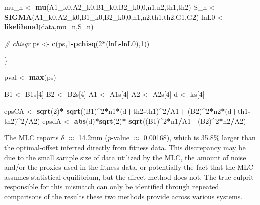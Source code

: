 \documentclass[]{article}
\newenvironment{Shaded}{\begin{snugshade}}{\end{snugshade}}
\newcommand{\CommentTok}[1]{\textcolor[rgb]{0.56,0.35,0.01}{\textit{#1}}}
\newcommand{\DecValTok}[1]{\textcolor[rgb]{0.00,0.00,0.81}{#1}}
\newcommand{\KeywordTok}[1]{\textcolor[rgb]{0.13,0.29,0.53}{\textbf{#1}}}
\newcommand{\NormalTok}[1]{#1}
\newcommand{\OperatorTok}[1]{\textcolor[rgb]{0.81,0.36,0.00}{\textbf{#1}}}
\newcommand{\StringTok}[1]{\textcolor[rgb]{0.31,0.60,0.02}{#1}}
\begin{document}
\begin{Shaded}
\begin{Highlighting}[]
\NormalTok{  mu_n <-}\StringTok{ }\KeywordTok{mu}\NormalTok{(A1_k0,A2_k0,B1_k0,B2_k0,}\DecValTok{0}\NormalTok{,n1,n2,th1,th2)}
\NormalTok{  S_n <-}\StringTok{ }\KeywordTok{SIGMA}\NormalTok{(A1_k0,A2_k0,B1_k0,B2_k0,}\DecValTok{0}\NormalTok{,n1,n2,th1,th2,G1,G2)}
\NormalTok{  lnL0  <-}\StringTok{ }\KeywordTok{likelihood}\NormalTok{(data,mu_n,S_n)}
  
  \CommentTok{# chisqr}
\NormalTok{  ps <-}\StringTok{ }\KeywordTok{c}\NormalTok{(ps,}\DecValTok{1}\OperatorTok{-}\KeywordTok{pchisq}\NormalTok{(}\DecValTok{2}\OperatorTok{*}\NormalTok{(lnL}\OperatorTok{-}\NormalTok{lnL0),}\DecValTok{1}\NormalTok{))}
  
\NormalTok{\}}

\NormalTok{pval <-}\StringTok{ }\KeywordTok{max}\NormalTok{(ps)}

\NormalTok{B1 <-}\StringTok{ }\NormalTok{B1s[}\DecValTok{4}\NormalTok{]}
\NormalTok{B2 <-}\StringTok{ }\NormalTok{B2s[}\DecValTok{4}\NormalTok{]}
\NormalTok{A1 <-}\StringTok{ }\NormalTok{A1s[}\DecValTok{4}\NormalTok{]}
\NormalTok{A2 <-}\StringTok{ }\NormalTok{A2s[}\DecValTok{4}\NormalTok{]}
\NormalTok{d  <-}\StringTok{  }\NormalTok{ks[}\DecValTok{4}\NormalTok{]}

\NormalTok{epsCA <-}\StringTok{ }\KeywordTok{sqrt}\NormalTok{(}\DecValTok{2}\NormalTok{)}\OperatorTok{*}
\StringTok{  }\KeywordTok{sqrt}\NormalTok{((B1)}\OperatorTok{^}\DecValTok{2}\OperatorTok{*}\NormalTok{n1}\OperatorTok{*}\NormalTok{(d}\OperatorTok{+}\NormalTok{th2}\OperatorTok{-}\NormalTok{th1)}\OperatorTok{^}\DecValTok{2}\OperatorTok{/}\NormalTok{A1}\OperatorTok{+}
\StringTok{       }\NormalTok{(B2)}\OperatorTok{^}\DecValTok{2}\OperatorTok{*}\NormalTok{n2}\OperatorTok{*}\NormalTok{(d}\OperatorTok{+}\NormalTok{th1}\OperatorTok{-}\NormalTok{th2)}\OperatorTok{^}\DecValTok{2}\OperatorTok{/}\NormalTok{A2)}
\NormalTok{epsdA <-}\StringTok{ }\KeywordTok{abs}\NormalTok{(d)}\OperatorTok{*}\KeywordTok{sqrt}\NormalTok{(}\DecValTok{2}\NormalTok{)}\OperatorTok{*}
\StringTok{  }\KeywordTok{sqrt}\NormalTok{((B1)}\OperatorTok{^}\DecValTok{2}\OperatorTok{*}\NormalTok{n1}\OperatorTok{/}\NormalTok{A1}\OperatorTok{+}\NormalTok{(B2)}\OperatorTok{^}\DecValTok{2}\OperatorTok{*}\NormalTok{n2}\OperatorTok{/}\NormalTok{A2)}
\end{Highlighting}
\end{Shaded}

The MLC reports \(\delta\) \(\approx\) 14.2mm (\emph{p}-value
\(\approx\) 0.00168), which is 35.8\% larger than the optimal-offset
inferred directly from fitness data. This discrepancy may be due to the
small sample size of data utilized by the MLC, the amount of noise
and/or the proxies used in the fitness data, or potentially the fact
that the MLC assumes statistical equilibrium, but the direct method does
not. The true culprit responsible for this mismatch can only be
identified through repeated comparisons of the results these two methods
provide across various systems.
\end{document}
